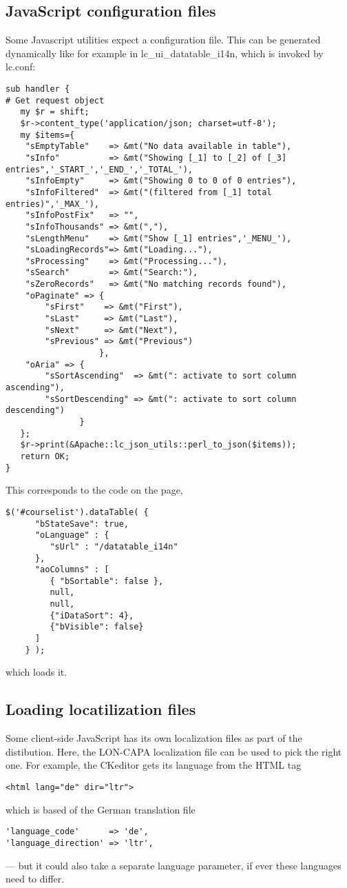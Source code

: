 \subsection{JavaScript configuration files}
Some Javascript utilities expect a configuration file. This can be generated dynamically like for example in lc\_ui\_datatable\_i14n, which is invoked by lc.conf:
\begin{verbatim}
sub handler {
# Get request object
   my $r = shift;
   $r->content_type('application/json; charset=utf-8');
   my $items={
    "sEmptyTable"    => &mt("No data available in table"),
    "sInfo"          => &mt("Showing [_1] to [_2] of [_3] entries",'_START_','_END_','_TOTAL_'),
    "sInfoEmpty"     => &mt("Showing 0 to 0 of 0 entries"),
    "sInfoFiltered"  => &mt("(filtered from [_1] total entries)",'_MAX_'),
    "sInfoPostFix"   => "",
    "sInfoThousands" => &mt(","),
    "sLengthMenu"    => &mt("Show [_1] entries",'_MENU_'),
    "sLoadingRecords"=> &mt("Loading..."),
    "sProcessing"    => &mt("Processing..."),
    "sSearch"        => &mt("Search:"),
    "sZeroRecords"   => &mt("No matching records found"),
    "oPaginate" => {
        "sFirst"    => &mt("First"),
        "sLast"     => &mt("Last"),
        "sNext"     => &mt("Next"),
        "sPrevious" => &mt("Previous")
                   },
    "oAria" => {
        "sSortAscending"  => &mt(": activate to sort column ascending"),
        "sSortDescending" => &mt(": activate to sort column descending")
               }
   };
   $r->print(&Apache::lc_json_utils::perl_to_json($items));
   return OK;
}
\end{verbatim}
This corresponds to the code on the page,
\begin{verbatim}
$('#courselist').dataTable( {
      "bStateSave": true,
      "oLanguage" : {
         "sUrl" : "/datatable_i14n"
      },
      "aoColumns" : [
         { "bSortable": false },
         null,
         null,
         {"iDataSort": 4},
         {"bVisible": false}
      ]
    } );
\end{verbatim}
which loads it.
\subsection{Loading locatilization files}
Some client-side JavaScript has its own localization files as part of the distibution. Here, the LON-CAPA localization file can be used to pick the right one. For example, the CKeditor gets its language from the HTML tag
\begin{verbatim}
<html lang="de" dir="ltr">
\end{verbatim}
which is based of the German translation file
\begin{verbatim}
'language_code'      => 'de',
'language_direction' => 'ltr',
\end{verbatim}
--- but it could also take a separate language parameter, if ever these languages need to differ.


